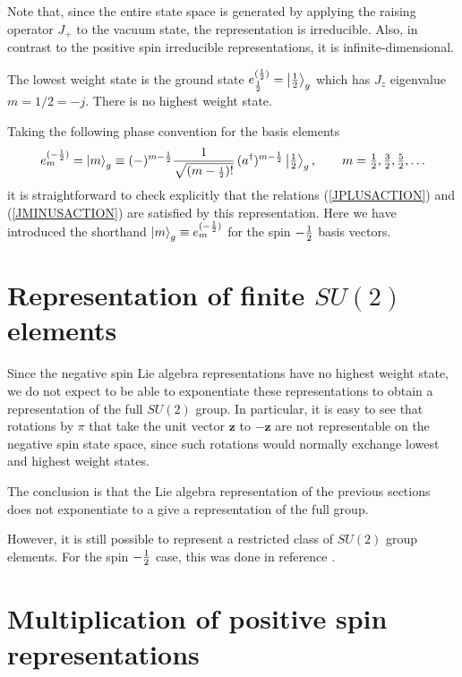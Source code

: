 \documentclass[a4paper,dvips,12pt]{article}
\newcommand {\half} {{1 \over 2}}
\newcommand {\hhalf} {{\textstyle{1 \over 2}}}
\newcommand {\hhhalf} {{\scriptstyle{1 \over 2}}}
\newcommand {\ket}[1] {\left| #1 \right>}
\begin{document}
    Note that, since the entire state space is generated by
    applying the raising operator $J_+$ to the vacuum state, the
    representation is irreducible.  Also, in contrast to the positive
    spin irreducible representations, it is infinite-dimensional.

    The lowest weight state is the ground state $e^{(\half)}_{\half} = \ket{\half}_g$
    which has
    $J_z$ eigenvalue $m = 1/2 = -j$.
    There is no highest weight state.

    Taking the following phase convention for the basis
    elements
    \begin{equation}
      e^{(-\half)}_{m} = \ket{m}_g \equiv (-)^{m-\half}{1\over \sqrt {\left({m-\hhhalf}\right)!}}\,(a^\dagger)^{m-\hhhalf}
      \ket{\hhalf}_g, \qquad m = \hhalf, {\textstyle {3\over 2}},
      {\textstyle {5\over 2}}, \ldots \label {BASIS}
    \end{equation}
    it is straightforward to check explicitly that
    the relations (\ref{JPLUSACTION}) and (\ref{JMINUSACTION}) are
    satisfied by this representation.  Here we have introduced the
    shorthand $\ket{m}_g \equiv e^{(-\half)}_{m}$ for the spin
    $-\half$ basis vectors.

    \section{Representation of finite $SU(2)$ elements}
    \label{FINITE}

    Since the negative spin Lie algebra representations have no
    highest weight state, we do not expect to be able to
    exponentiate these representations to obtain a representation
    of the full $SU(2)$ group.  In particular, it is easy to see that
    rotations by $\pi$ that take the unit vector $\mathbf{z}$ to $-\mathbf{z}$
    are not representable on the negative spin state space, since
    such rotations would normally exchange lowest and highest weight states.

    The conclusion is that the Lie algebra representation of the
    previous sections
    does not exponentiate to a give a representation of the full
    group.

    However, it is still possible to represent a restricted class
    of $SU(2)$ group elements.  For the spin $-\half$ case, this
    was done in reference \cite{MYSELF}.


    \section{Multiplication of positive spin representations}
\end{document}
